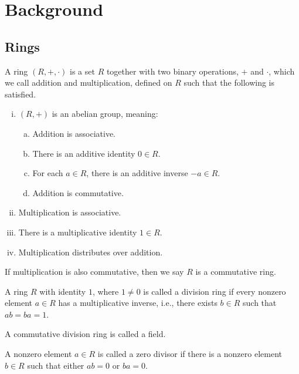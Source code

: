 \section{Background}

\subsection{Rings}

\begin{defn}
  A ring $(R, +, \cdot)$ is a set $R$ together with two binary operations, $+$
  and $\cdot$, which we call addition and multiplication, defined on $R$ such
  that the following is satisfied.
  
  \begin{enumerate}[(i)]
    \item $(R,+)$ is an abelian group, meaning:
    \begin{enumerate}[(a)]
      \item Addition is associative.
      \item There is an additive identity $0 \in R$.
      \item For each $a \in R$, there is an additive inverse $-a \in R$.
      \item Addition is commutative.
    \end{enumerate}
    
    \item Multiplication is associative. 
    \item There is a multiplicative identity $1 \in R$.
    \item Multiplication distributes over addition.
  \end{enumerate}
  
  If multiplication is also commutative, then we say $R$ is a commutative ring.
\end{defn}


\begin{defn}
  A ring $R$ with identity $1$, where $1 \neq 0$ is called a division ring
  if every nonzero element $a \in R$ has a multiplicative inverse, i.e., there
  exists $b \in R$ such that $ab=ba=1$.
  
  A commutative division ring is called a field. 
\end{defn}


\begin{defn}
  A nonzero element $a \in R$ is called a zero divisor if there is a nonzero
  element $b \in R$ such that either $ab=0$ or $ba=0$.
\end{defn}


